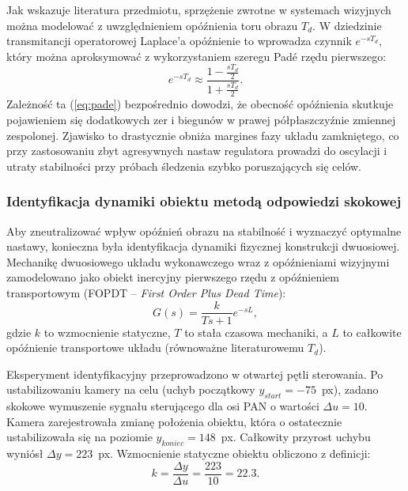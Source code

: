 \documentclass[a4paper,twoside,12pt]{book}
\begin{document}
Jak wskazuje literatura przedmiotu, sprzężenie zwrotne w systemach wizyjnych można modelować z uwzględnieniem opóźnienia toru obrazu $T_{d}$. W dziedzinie transmitancji operatorowej Laplace’a opóźnienie to wprowadza czynnik $e^{-sT_{d}}$, który można aproksymować z wykorzystaniem szeregu Padé rzędu pierwszego\cite{bib:SKOGESTAD2003291}:
\begin{equation}
e^{-sT_{d}} \approx \frac{1 - \frac{sT_{d}}{2}}{1 + \frac{sT_{d}}{2}}.
\label{eq:pade}
\end{equation}
Zależność ta (\ref{eq:pade}) bezpośrednio dowodzi, że obecność opóźnienia skutkuje pojawieniem się dodatkowych zer i biegunów w prawej półpłaszczyźnie zmiennej zespolonej. Zjawisko to drastycznie obniża margines fazy układu zamkniętego, co przy zastosowaniu zbyt agresywnych nastaw regulatora prowadzi do oscylacji i utraty stabilności przy próbach śledzenia szybko poruszających się celów.

\subsubsection{Identyfikacja dynamiki obiektu metodą odpowiedzi skokowej}
Aby zneutralizować wpływ opóźnień obrazu na stabilność i wyznaczyć optymalne nastawy, konieczna była identyfikacja dynamiki fizycznej konstrukcji dwuosiowej. Mechanikę dwuosiowego układu wykonawczego wraz z opóźnieniami wizyjnymi zamodelowano jako obiekt inercyjny pierwszego rzędu z opóźnieniem transportowym (FOPDT – \textit{First Order Plus Dead Time})\cite{bib:SKOGESTAD2003291}:
\begin{equation}
G(s) = \frac{k}{Ts + 1} e^{-sL},
\end{equation}
gdzie $k$ to wzmocnienie statyczne, $T$ to stała czasowa mechaniki, a $L$ to całkowite opóźnienie transportowe układu (równoważne literaturowemu $T_{d}$).

Eksperyment identyfikacyjny przeprowadzono w otwartej pętli sterowania. Po ustabilizowaniu kamery na celu (uchyb początkowy $y_{start} = -75$~px), zadano skokowe wymuszenie sygnału sterującego dla osi PAN o wartości $\Delta u = 10$. Kamera zarejestrowała zmianę położenia obiektu, która o ostatecznie ustabilizowała się na poziomie $y_{koniec} = 148$~px. Całkowity przyrost uchybu wyniósł $\Delta y = 223$~px. 
Wzmocnienie statyczne obiektu obliczono z definicji:
\begin{equation}
k = \frac{\Delta y}{\Delta u} = \frac{223}{10} = 22.3.
\end{equation}
\end{document}
